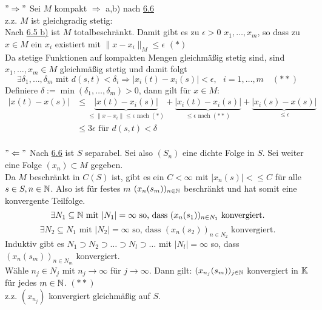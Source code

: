 \begin{beweis}
	$"\Rightarrow"$ Sei $M$ kompakt $\Rightarrow$ a,b) nach \hyperref[prop:6.6]{6.6} \\
	z.z. $M$ ist gleichgradig stetig: \\
	Nach \hyperref[satz:6.5b]{6.5 b)} ist $M$ totalbeschränkt. Damit gibt es zu $\epsilon > 0$ $x_{1}, \dotsc, x_{m}$, so dass zu $x \in M$ ein $x_{i}$ existiert mit $\| x - x_{i} \|_{M} \leq \epsilon$ $(*)$ \\
	Da stetige Funktionen auf kompakten Mengen gleichmä{\ss}ig stetig sind, sind$x_{1}, \dotsc, x_{m} \in M$ gleichmä{\ss}ig stetig und damit folgt 
	\[ \exists \delta_{1}, \dotsc, \delta_{m} \text{ mit } d(s, t) < \delta_{i} \Rightarrow |x_{i}(t) - x_{i}(s)| < \epsilon, \text{ } i = 1, \dotsc, m \quad (**) \]
	Definiere $\delta := \min(\delta_{1}, \dotsc, \delta_{m}) > 0$, dann gilt für $x \in M$:
	\begin{align*}
		| x(t) - x(s) | & \leq \underbrace{| x(t) - x_{i}(s) |}_{\leq \| x - x_{i} \| \leq \epsilon \text{ nach } (*) } + \underbrace{| x_{i}(t) - x_{i}(s) |}_{\leq \epsilon \text{ nach } (**) } + \underbrace{| x_{i}(s) - x(s) |}_{\leq \epsilon} \\
						& \leq 3 \epsilon \text{ für } d(s, t) < \delta 
	\end{align*} \\
	$"\Leftarrow"$ Nach \hyperref[prop:6.6]{6.6} ist $S$ separabel. Sei also $(S_{n})$ eine dichte Folge in $S$. Sei weiter eine Folge $(x_{n}) \subset M$ gegeben. \\
	Da $M$ beschränkt in $C(S)$ ist, gibt es ein $C < \infty$ mit $| x_{n}(s) | <\leq C$ für alle $s \in S, n \in \mathbb{N}$. Also ist für festes $m$ $(x_{n}(s_{m}))_{n \in \mathbb{N}}$ beschränkt und hat somit eine konvergente Teilfolge. \\
	\[ \exists N_{1} \subseteq \mathbb{N} \text{ mit } |N_{1}| = \infty \text{ so, dass } (x_{n}(s_{1}))_{n \in N_{1}} \text{ konvergiert.}  \]
	\[ \exists N_{2} \subseteq N_{1} \text{ mit } |N_{2}| = \infty \text{ so, dass } (x_{n}(s_{2}))_{n \in N_{2}} \text{ konvergiert.}  \]	
	Induktiv gibt es $N_{1} \supset N_{2} \supset \dotsc \supset N_{l} \supset \dotsc$ mit $|N_{l}| = \infty$ so, dass $(x_{n}(s_{m}))_{n \in N_{m}}$ konvergiert. \\
	Wähle $n_{j} \in N_{j}$ mit $n_{j} \rightarrow \infty$ für $j \rightarrow \infty$. Dann gilt: $(x_{n_{j}}(s_{m}))_{j \in \mathbb{N}}$ konvergiert in $\mathbb{K}$ für jedes $m \in \mathbb{N}$. $(**)$ \\
	z.z. $(x_{n_{j}})$ konvergiert gleichmä{\ss}ig auf $S$. \\

\end{beweis}
